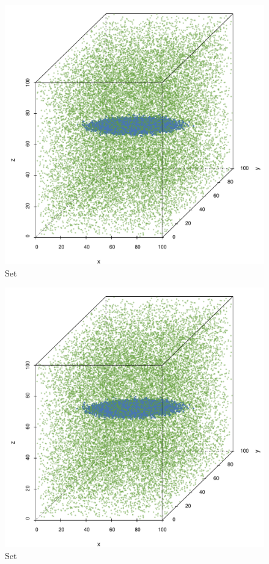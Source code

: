 \begin{subfigure}{0.23\textwidth}
	\centering
	\includegraphics[width=\textwidth]{experiment/img/datasetplot_baakman_4_60000}
	\caption{Set \baakmanFour}
	\label{fig:3:simulated:datasets:baakman4}
\end{subfigure}	
\begin{subfigure}{0.23\textwidth}
	\centering
	\includegraphics[width=\textwidth]{experiment/img/datasetplot_baakman_5_60000}
	\caption{Set \baakmanFive}
	\label{fig:3:simulated:datasets:baakman5}
\end{subfigure}	
